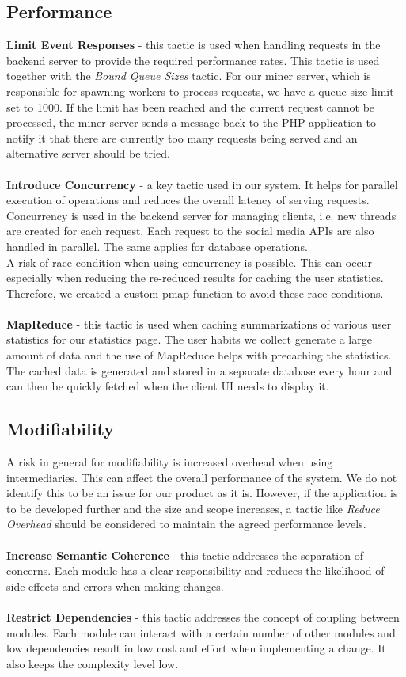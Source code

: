 \subsection{Performance}
\textbf{Limit Event Responses} - this tactic is used when handling requests in
the backend server to provide the required performance rates. This tactic is
used together with the \textit{Bound Queue Sizes} tactic. For our miner server,
which is responsible for spawning workers to process requests, we have a queue
size limit set to 1000. If the limit has been reached and the current request
cannot be processed, the miner server sends a message back to the PHP
application to notify it that there are currently too many requests being served
and an alternative server should be tried. \\ \\
\textbf{Introduce Concurrency} - a key tactic used in our system. It helps for
parallel execution of operations and reduces the overall latency of serving
requests. Concurrency is used in the backend server for managing clients, i.e.
new threads are created for each request. Each request to the social media APIs
are also handled in parallel. The same applies for database operations. \\

A risk of race condition when using concurrency is possible. This can occur
especially when reducing the re-reduced results for caching the user statistics.
Therefore, we created a custom pmap function to avoid these race conditions.
\\ \\
\textbf{MapReduce} - this tactic is used when caching summarizations of various
user statistics for our statistics page. The user habits we collect generate a
large amount of data and the use of MapReduce helps with precaching the
statistics. The cached data is generated and stored in a separate database every
hour and can then be quickly fetched when the client UI needs to display it.

\subsection{Modifiability}
A risk in general for modifiability is increased overhead when using
intermediaries. This can affect the overall performance of the system. We do not
identify this to be an issue for our product as it is. However, if the
application is to be developed further and the size and scope increases, a
tactic like \textit{Reduce Overhead} should be considered to maintain the agreed
performance levels. \\ \\
\textbf{Increase Semantic Coherence} - this tactic addresses the separation of
concerns. Each module has a clear responsibility and reduces the likelihood of
side effects and errors when making changes. \\ \\
\textbf{Restrict Dependencies} - this tactic addresses the concept of coupling
between modules. Each module can interact with a certain number of other modules
and low dependencies result in low cost and effort when implementing a change.
It also keeps the complexity level low.

